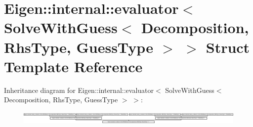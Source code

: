 \hypertarget{struct_eigen_1_1internal_1_1evaluator_3_01_solve_with_guess_3_01_decomposition_00_01_rhs_type_00_01_guess_type_01_4_01_4}{}\section{Eigen\+:\+:internal\+:\+:evaluator$<$ Solve\+With\+Guess$<$ Decomposition, Rhs\+Type, Guess\+Type $>$ $>$ Struct Template Reference}
\label{struct_eigen_1_1internal_1_1evaluator_3_01_solve_with_guess_3_01_decomposition_00_01_rhs_type_00_01_guess_type_01_4_01_4}
Inheritance diagram for Eigen\+:\+:internal\+:\+:evaluator$<$ Solve\+With\+Guess$<$ Decomposition, Rhs\+Type, Guess\+Type $>$ $>$\+:\begin{figure}[H]
\begin{center}
\leavevmode
\includegraphics[height=0.676329cm]{struct_eigen_1_1internal_1_1evaluator_3_01_solve_with_guess_3_01_decomposition_00_01_rhs_type_00_01_guess_type_01_4_01_4}
\end{center}
\end{figure}
